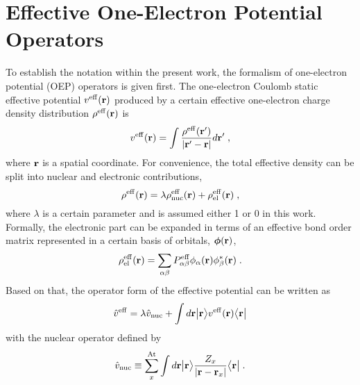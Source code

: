 \section{\label{s:2.oep}Effective One-Electron Potential Operators}

To establish the notation within the present work, 
the formalism of one\hyp{}electron potential (OEP) operators is
given first.
The one\hyp{}electron Coulomb static effective potential $v^{\rm eff}({\bf r})$
produced by a certain effective one\hyp{}electron charge density distribution $\rho^{\rm eff}({\bf r})$
is 
%
\begin{equation} \label{e:v-eff}
	v^{\rm eff}({\bf r}) = \int \frac{ \rho^{\rm eff}({\bf r}') }{ \vert {\bf r}' - {\bf r} \vert} d{\bf r}' \;,
\end{equation}
%
where ${\bf r}$ is a spatial coordinate. 
For convenience, the total effective density can be split into nuclear and electronic contributions,
%
\begin{equation} \label{e:rho-eff}
 \rho^{\rm eff}({\bf r}) = \lambda \rho^{\rm eff}_{\rm nuc}({\bf r}) + \rho^{\rm eff}_{\rm el}({\bf r}) \;,
\end{equation}
%
where $\lambda$ is a certain parameter and is assumed either 1 or 0 in this work.
Formally, the electronic part can be expanded in terms of an effective
bond order matrix represented in a certain basis of orbitals, $\BM{\phi}({\bf r})$,
%
\begin{equation} \label{e:d-spectral}
	\rho^{\rm eff}_{\rm el}({\bf r}) = \sum_{\alpha\beta} P_{\alpha\beta}^{\rm eff} 
	\phi_\alpha({\bf r}) \phi_\beta^{*}({\bf r})  \;.
\end{equation}
%
Based on that, the operator form of the effective potential 
can be written as
%
\begin{equation} \label{e:oep-operator}
	\hat{v}^{\rm eff} = 
        \lambda \hat{v}_{\rm nuc} +
        \int d{\bf r} \Ket{{\bf r}} 
        v^{\rm eff}({\bf r})
        \Bra{{\bf r}}
\end{equation}
%
with the nuclear
operator
defined by
%
\begin{equation} \label{e:oep-operator-nuc}
        \hat{v}_{\rm nuc} \equiv \sum_x^{\rm At}  
                     \int d{\bf r} \Ket{{\bf r}} 
                     \frac{Z_x}{\vert {\bf r} - {\bf r}_x \vert}
                     \Bra{{\bf r}} \;.
\end{equation}
